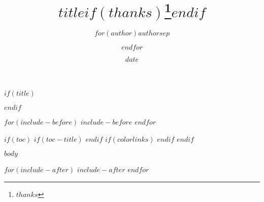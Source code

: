 \documentclass{book}
\title{$title$$if(thanks)$\thanks{$thanks$}$endif$}
\author{$for(author)$$author$$sep$ \and $endfor$}
\date{$date$}
\begin{document}
$if(title)$
\maketitle
$endif$

$for(include-before)$
$include-before$
$endfor$

%
%
$if(toc)$
$if(toc-title)$
  \renewcommand*\contentsname{$toc-title$}
$endif$
$if(colorlinks)$
  \hypersetup{linkcolor=$if(toccolor)$$toccolor$$else$$endif$}
$endif$
\setcounter{tocdepth}{$toc-depth$}
\tableofcontents
$endif$

$body$

$for(include-after)$
$include-after$
$endfor$
\end{document}
